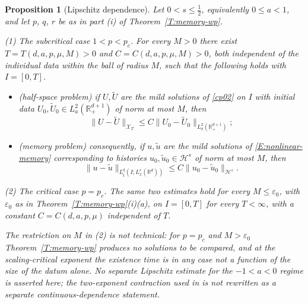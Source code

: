\documentclass[11pt,letter]{amsart}
\def \RN {\mathbb{R}_+^{d+1}}
\newcommand{\Rd}{\mathbb R^d}
\numberwithin{equation}{section}
\newtheorem{proposition}[theorem]{Proposition}
\numberwithin{equation}{section}
\begin{document}
\begin{proposition}[Lipschitz dependence]\label{P:contdep}
Let $0<s\le\frac12$, equivalently $0\le a<1$, and let $p$, $q$, $r$ be
as in part (i) of Theorem~\ref{T:memory-wp}.

\smallskip
\noindent\emph{(1) The subcritical case $1<p<p_c$.} For every $M>0$ there exist
$T=T(d,a,p,\mu,M)>0$ and $C=C(d,a,p,\mu,M)>0$, both independent of the
individual data within the ball of radius $M$, such that the following holds
with $I=[0,T]$.
\begin{itemize}
\item[(i)] \emph{(half-space problem)} if $U,\widetilde U$ are the mild
solutions of \eqref{cp02} on $I$ with initial data
$U_0,\widetilde U_0\in L^2_a(\RN)$ of norm at most $M$, then
\[
\|U-\widetilde U\|_{\mathcal X_T}
\leq C\|U_0-\widetilde U_0\|_{L^2_a(\RN)};
\]
\item[(ii)] \emph{(memory problem)} consequently, if $u,\widetilde u$ are the
mild solutions of \eqref{E:nonlinear-memory} corresponding to histories
$u_0,\widetilde u_0\in\mathcal H^s$ of norm at most $M$, then
\[
\|u-\widetilde u\|_{L^q_t(I;L^r_x(\Rd))}
\leq C\|u_0-\widetilde u_0\|_{\mathcal H^s}.
\]
\end{itemize}

\smallskip
\noindent\emph{(2) The critical case $p=p_c$.} The same two estimates hold for
every $M\le\varepsilon_0$, with $\varepsilon_0$ as in
Theorem~\ref{T:memory-wp}(i)(a), on $I=[0,T]$ for every $T<\infty$, with a
constant $C=C(d,a,p,\mu)$ independent of $T$.

\smallskip
\noindent
The restriction on $M$ in (2) is not technical: for $p=p_c$ and $M>\varepsilon_0$
Theorem~\ref{T:memory-wp} produces no solutions to be compared, and at the
scaling-critical exponent the existence time is in any case not a function of
the size of the datum alone. No separate Lipschitz estimate for the
$-1<a<0$ regime is asserted here; the two-exponent contraction used in
\cite[Theorem~2.10]{GS2} is not rewritten as a separate continuous-dependence
statement.
\end{proposition}
\end{document}
